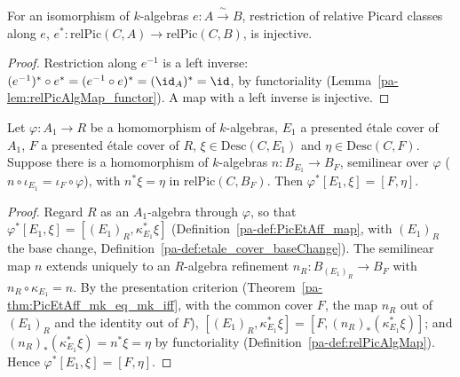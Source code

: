 \begin{lemma}
  \label{pa-lem:relPicAlgMap_algEquiv_injective}
  \leanok

  For an isomorphism of \(k\)-algebras \(e \colon A \xrightarrow{\ \sim\ } B\), restriction of
  relative Picard classes along \(e\), \(e^{*} \colon \mathrm{relPic}(C, A) \to \mathrm{relPic}(C,
  B)\), is injective.
\end{lemma}
\begin{proof}
  \leanok
  Restriction along \(e^{-1}\) is a left inverse: \((e^{-1})^{*} \circ e^{*} = (e^{-1} \circ e)^{*}
  = (\id_A)^{*} = \id\), by functoriality (Lemma~\ref{pa-lem:relPicAlgMap_functor}). A map with a left
  inverse is injective.
\end{proof}

\begin{lemma}
  \label{pa-lem:PicEtAff_mapAlg_mk_eq_mk}
  \leanok

  Let \(\varphi \colon A_1 \to R\) be a homomorphism of \(k\)-algebras, \(E_1\) a presented \'etale
  cover of \(A_1\), \(F\) a presented \'etale cover of \(R\), \(\xi \in \mathrm{Desc}(C, E_1)\) and
  \(\eta \in \mathrm{Desc}(C, F)\). Suppose there is a homomorphism of \(k\)-algebras \(n \colon
  B_{E_1} \to B_F\), semilinear over \(\varphi\) (\(n \circ \iota_{E_1} = \iota_F \circ \varphi\)),
  with \(n^{*}\xi = \eta\) in \(\mathrm{relPic}(C, B_F)\). Then \(\varphi^{*}[E_1, \xi] = [F, \eta]\).
\end{lemma}
\begin{proof}
  \leanok
  Regard \(R\) as an \(A_1\)-algebra through \(\varphi\), so that \(\varphi^{*}[E_1, \xi] =
  [(E_1)_R, \kappa_{E_1}^{*}\xi]\) (Definition~\ref{pa-def:PicEtAff_map}, with \((E_1)_R\) the base
  change, Definition~\ref{pa-def:etale_cover_baseChange}). The semilinear map \(n\) extends uniquely to
  an \(R\)-algebra refinement \(n_R \colon B_{(E_1)_R} \to B_F\) with \(n_R \circ \kappa_{E_1} = n\).
  By the presentation criterion (Theorem~\ref{pa-thm:PicEtAff_mk_eq_mk_iff}, with the common cover
  \(F\), the map \(n_R\) out of \((E_1)_R\) and the identity out of \(F\)), \([(E_1)_R,
  \kappa_{E_1}^{*}\xi] = [F, (n_R)_{*}(\kappa_{E_1}^{*}\xi)]\); and \((n_R)_{*}(\kappa_{E_1}^{*}\xi)
  = n^{*}\xi = \eta\) by functoriality (Definition~\ref{pa-def:relPicAlgMap}). Hence
  \(\varphi^{*}[E_1, \xi] = [F, \eta]\).
\end{proof}

